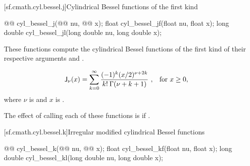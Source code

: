 [sf.cmath.cyl.bessel.j]{Cylindrical Bessel functions of the first kind}%
%
%
%
%
%
\begin{itemdecl}
@@ cyl_bessel_j(@@ nu, @@ x);
float        cyl_bessel_jf(float nu, float x);
long double  cyl_bessel_jl(long double nu, long double x);
\end{itemdecl}

\begin{itemdescr}

\pnum
\effects
These functions compute
the cylindrical Bessel functions of the first kind
of their respective arguments
 and .

\pnum
\returns
\[ \mathsf{J}_\nu(x) =
   \sum_{k=0}^\infty \frac{(-1)^k (x/2)^{\nu+2k}}{k! \: \Gamma(\nu+k+1)}
   \text{ ,\quad for $x \ge 0$,} \]
where
$\nu$ is  and
$x$ is .

\pnum
\remarks
The effect of calling each of these functions
is 
if .
\end{itemdescr}

[sf.cmath.cyl.bessel.k]{Irregular modified cylindrical Bessel functions}%
%
%
%
%
%
\begin{itemdecl}
@@ cyl_bessel_k(@@ nu, @@ x);
float        cyl_bessel_kf(float nu, float x);
long double  cyl_bessel_kl(long double nu, long double x);
\end{itemdecl}

